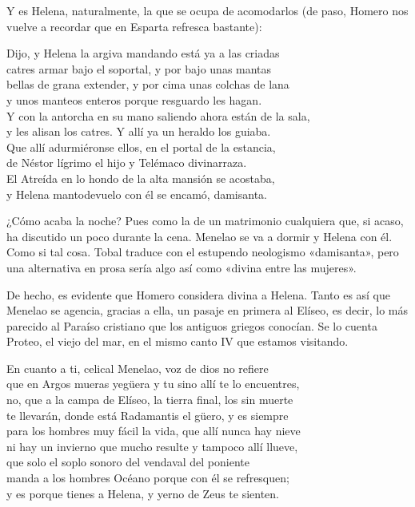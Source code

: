 Y es Helena, naturalmente, la que se ocupa de acomodarlos (de paso, Homero nos vuelve a recordar que en Esparta refresca bastante):

\begin{versocita}
Dijo, y Helena la argiva mandando está ya a las criadas\\
catres armar bajo el soportal, y por bajo unas mantas\\
bellas de grana extender, y por cima unas colchas de lana\\
y unos manteos enteros porque resguardo les hagan.\\
Y con la antorcha en su mano saliendo ahora están de la sala,\\
y les alisan los catres. Y allí ya un heraldo los guiaba.\\
Que allí adurmiéronse ellos, en el portal de la estancia,\\
de Néstor lígrimo el hijo y Telémaco divinarraza.\\
El Atreída en lo hondo de la alta mansión se acostaba,\\
y Helena mantodevuelo con él se encamó, damisanta.
\end{versocita}

¿Cómo acaba la noche? Pues como la de un matrimonio cualquiera que, si acaso, ha discutido un poco durante la cena. Menelao se va a dormir y Helena con él. Como si tal cosa. Tobal traduce  con el estupendo neologismo «damisanta», pero una alternativa en prosa sería algo así como «divina entre las mujeres».

De hecho, es evidente que Homero considera divina a Helena. Tanto es así que Menelao se agencia, gracias a ella, un pasaje en primera al Elíseo, es decir, lo más parecido al Paraíso cristiano que los antiguos griegos conocían. Se lo cuenta Proteo, el viejo del mar, en el mismo canto IV que estamos visitando.

\begin{versocita}
En cuanto a ti, celical Menelao, voz de dios no refiere\\
que en Argos mueras yegüera y tu sino allí te lo encuentres,\\
no, que a la campa de Elíseo, la tierra final, los sin muerte\\
te llevarán, donde está Radamantis el güero, y es siempre\\
para los hombres muy fácil la vida, que allí nunca hay nieve\\
ni hay un invierno que mucho resulte y tampoco allí llueve,\\
que solo el soplo sonoro del vendaval del poniente\\
manda a los hombres Océano porque con él se refresquen;\\
y es porque tienes a Helena, y yerno de Zeus te sienten.
\end{versocita}

